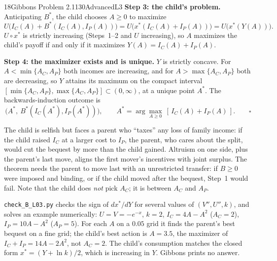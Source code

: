 \begin{exsol}{18}{Gibbons Problem 2.1}{130}{Advanced}{L3}
\textbf{Step 3: the child's problem.} Anticipating $B^*$, the child chooses $A \ge 0$ to maximize
\[
  U\bigl(I_C(A) + B^*(I_C(A), I_P(A))\bigr) = U\bigl(x^*(I_C(A) + I_P(A))\bigr) = U\bigl(x^*(Y(A))\bigr).
\]
$U \circ x^*$ is strictly increasing (Steps~1--2 and $U$ increasing), so $A$ maximizes the child's
payoff if and only if it maximizes $Y(A) = I_C(A) + I_P(A)$.

\textbf{Step 4: the maximizer exists and is unique.} $Y$ is strictly concave. For
$A < \min\{A_C, A_P\}$ both incomes are increasing, and for $A > \max\{A_C, A_P\}$ both are
decreasing, so $Y$ attains its maximum on the compact interval $[\min\{A_C,A_P\}, \max\{A_C,A_P\}]
\subset (0, \infty)$, at a unique point $A^*$. The backwards-induction outcome is
\[
  \bigl(A^*,\ B^*(I_C(A^*), I_P(A^*))\bigr), \qquad A^* = \arg\max_{A \ge 0}\ [\,I_C(A) + I_P(A)\,].
  \qquad\square
\]

\interp The child is selfish but faces a parent who ``taxes'' any loss of family income: if the
child raised $I_C$ at a larger cost to $I_P$, the parent, who cares about the split, would cut the
bequest by more than the child gained. Altruism on one side, plus the parent's last move, aligns the
first mover's incentives with joint surplus. The theorem needs the parent to move last with an
unrestricted transfer: if $B \ge 0$ were imposed and binding, or if the child moved after the
bequest, Step~1 would fail. Note that the child does \emph{not} pick $A_C$; it is between $A_C$ and
$A_P$.

\verify \texttt{check\_B\_L03.py} checks the sign of $dx^*/dY$ for several values of
$(V'', U'', k)$, and solves an example numerically: $U = V = -e^{-x}$, $k = 2$,
$I_C = 4A - A^2$ ($A_C = 2$), $I_P = 10A - A^2$ ($A_P = 5$). For each $A$ on a $0.05$ grid it finds
the parent's best bequest on a fine grid; the child's best action is $A = 3.5$, the maximizer of
$I_C + I_P = 14A - 2A^2$, not $A_C = 2$. The child's consumption matches the closed form
$x^* = (Y + \ln k)/2$, which is increasing in $Y$. Gibbons prints no answer.

\end{exsol}
